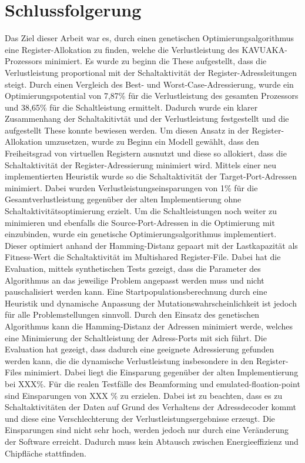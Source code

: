 \chapter{Schlussfolgerung}
\label{chap:schlussfolgerung}
Das Ziel dieser Arbeit war es, durch einen genetischen Optimierungsalgorithmus eine Register-Allokation zu finden, welche die Verlustleistung des KAVUAKA-Prozessors minimiert. Es wurde zu beginn die These aufgestellt, dass die Verlustleistung proportional mit der Schaltaktivität der Register-Adressleitungen steigt. Durch einen Vergleich des Best- und Worst-Case-Adressierung, wurde ein Optimierungspotential von 7,87\% für die Verlustleistung des gesamten Prozessors und 38,65\% für die Schaltleistung ermittelt. Dadurch wurde ein klarer Zusammenhang der Schaltakitivtät und der Verlustleistung festgestellt und die aufgestellt These konnte bewiesen werden. Um diesen Ansatz in der Register-Allokation umzusetzen, wurde zu Beginn ein Modell gewählt, dass den Freiheitsgrad von virtuellen Registern ausnutzt und diese so allokiert, dass die Schaltaktivität der Register-Adressierung minimiert wird. Mittels einer neu implementierten Heuristik wurde so die Schaltaktivität der Target-Port-Adressen minimiert. Dabei wurden Verlustleistungseinsparungen von 1\% für die Gesamtverlustleistung gegenüber der alten Implementierung ohne Schaltaktivitätsoptimierung erzielt.
Um die Schaltleistungen noch weiter zu minimieren und ebenfalls die Source-Port-Adressen in die Optimierung mit einzubinden, wurde ein genetische Optimierungsalgorithmus implementiert. Dieser optimiert anhand der Hamming-Distanz gepaart mit der Lastkapazität als Fitness-Wert die Schaltaktivität im Multishared Register-File. Dabei hat die Evaluation, mittels synthetischen Tests gezeigt, dass die Parameter des Algorithmus an das jeweilige Problem angepasst werden muss und nicht pauschalisiert werden kann. Eine Startpopulationsberechnung durch eine Heuristik und dynamische Anpassung der Mutationswahrscheinlichkeit ist jedoch für alle Problemstellungen sinnvoll.
Durch den Einsatz des genetischen Algorithmus kann die Hamming-Distanz der Adressen minimiert werde, welches eine Minimierung der Schaltleistung der Adress-Ports mit sich führt.  
Die Evaluation hat gezeigt, dass dadurch eine geeignete Adressierung gefunden werden kann, die die dynamische Verlustleistung insbesondere in den Register-Files minimiert. Dabei liegt die Einsparung gegenüber der alten Implementierung bei XXX\%. Für die realen Testfälle des Beamforming und emulated-floation-point sind Einsparungen von XXX \% zu erzielen. Dabei ist zu beachten, dass es zu Schaltaktivitäten der Daten auf Grund des Verhaltens der Adressdecoder kommt und diese eine Verschlechterung der Verlustleistungsergebnisse erzeugt. Die Einsparungen sind nicht sehr hoch, werden jedoch nur durch eine Veränderung der Software erreicht. Dadurch muss kein Abtausch zwischen Energieeffizienz und Chipfläche stattfinden.
